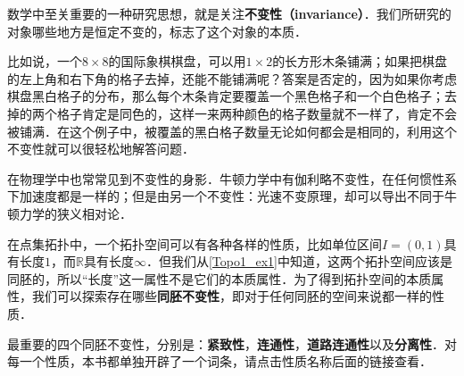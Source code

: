 数学中至关重要的一种研究思想，就是关注\textbf{不变性（invariance）}．我们所研究的对象哪些地方是恒定不变的，标志了这个对象的本质．

比如说，一个$8\times8$的国际象棋棋盘，可以用$1\times2$的长方形木条铺满；如果把棋盘的左上角和右下角的格子去掉，还能不能铺满呢？答案是否定的，因为如果你考虑棋盘黑白格子的分布，那么每个木条肯定要覆盖一个黑色格子和一个白色格子；去掉的两个格子肯定是同色的，这样一来两种颜色的格子数量就不一样了，肯定不会被铺满．在这个例子中，被覆盖的黑白格子数量无论如何都会是相同的，利用这个不变性就可以很轻松地解答问题．

在物理学中也常常见到不变性的身影．牛顿力学中有伽利略不变性，在任何惯性系下加速度都是一样的；但是由另一个不变性：光速不变原理，却可以导出不同于牛顿力学的狭义相对论．

在点集拓扑中，一个拓扑空间可以有各种各样的性质，比如单位区间$I=(0,1)$具有长度$1$，而$\mathbb{R}$具有长度$\infty$．但我们从\autoref{Topo1_ex1}中知道，这两个拓扑空间应该是同胚的，所以“长度”这一属性不是它们的本质属性．为了得到拓扑空间的本质属性，我们可以探索存在哪些\textbf{同胚不变性}，即对于任何同胚的空间来说都一样的性质．

最重要的四个同胚不变性，分别是：\textbf{紧致性}，\textbf{连通性}，\textbf{道路连通性}以及\textbf{分离性}．对每一个性质，本书都单独开辟了一个词条，请点击性质名称后面的链接查看．

